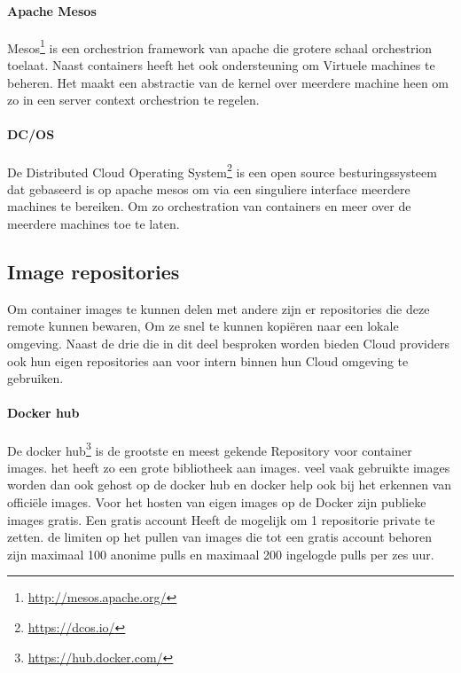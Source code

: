 \paragraph{Apache Mesos}
Mesos\footnote{\url{http://mesos.apache.org/}} is een orchestrion framework van apache die grotere schaal orchestrion toelaat. Naast containers heeft het ook ondersteuning om Virtuele machines te beheren. Het maakt een abstractie van de kernel over meerdere machine heen om zo in een server context orchestrion te regelen.
\paragraph{DC/OS}
De Distributed Cloud Operating System\footnote{\url{https://dcos.io/}} is een open source besturingssysteem dat gebaseerd is op apache mesos om via een singuliere interface meerdere machines te bereiken. Om zo orchestration van containers en meer over de meerdere machines toe te laten.
\subsection{Image repositories}
Om container images te kunnen delen met andere zijn er repositories die deze remote kunnen bewaren, Om ze snel te kunnen kopiëren naar een lokale omgeving. Naast de drie die in dit deel besproken worden bieden Cloud providers ook hun eigen repositories aan voor intern binnen hun Cloud omgeving te gebruiken.
\paragraph{Docker hub}
De docker hub\footnote{\url{https://hub.docker.com/}} is de grootste en meest gekende Repository voor container images. het heeft zo een grote bibliotheek aan images. veel vaak gebruikte images worden dan ook gehost op de docker hub en docker help ook bij het erkennen van officiële images. Voor het hosten van eigen images op de Docker zijn publieke images gratis. Een gratis account Heeft de mogelijk om 1 repositorie private te zetten. de limiten op het pullen van images die tot een gratis account behoren zijn maximaal 100 anonime pulls en maximaal 200 ingelogde pulls per zes uur. 
